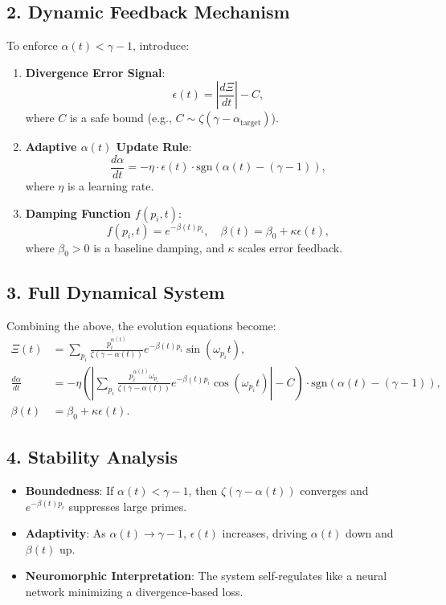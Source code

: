 \documentclass{article}
\theoremstyle{plain}
\theoremstyle{claimstyle}
\begin{document}
\subsection*{2. Dynamic Feedback Mechanism}

To enforce \( \alpha(t) < \gamma - 1 \), introduce:

\begin{enumerate}
    \item \textbf{Divergence Error Signal}:
    \[
    \epsilon(t) = \left| \frac{d\Xi}{dt} \right| - C,
    \]
    where \( C \) is a safe bound (e.g., \( C \sim \zeta(\gamma - \alpha_{\text{target}}) \)).

    \item \textbf{Adaptive \( \alpha(t) \) Update Rule}:
    \[
    \frac{d\alpha}{dt} = -\eta \cdot \epsilon(t) \cdot \text{sgn}(\alpha(t) - (\gamma - 1)),
    \]
    where \( \eta \) is a learning rate.

    \item \textbf{Damping Function \( f(p_i, t) \)}:
    \[
    f(p_i, t) = e^{-\beta(t) p_i}, \quad \beta(t) = \beta_0 + \kappa \epsilon(t),
    \]
    where \( \beta_0 > 0 \) is a baseline damping, and \( \kappa \) scales error feedback.
\end{enumerate}

\subsection*{3. Full Dynamical System}

Combining the above, the evolution equations become:
\[
\begin{aligned}
\Xi(t) &= \sum_{p_i} \frac{p_i^{\alpha(t)}}{\zeta(\gamma - \alpha(t))} e^{-\beta(t) p_i} \sin(\omega_{p_i} t), \\
\frac{d\alpha}{dt} &= -\eta \left( \left| \sum_{p_i} \frac{p_i^{\alpha(t)} \omega_{p_i}}{\zeta(\gamma - \alpha(t))} e^{-\beta(t) p_i} \cos(\omega_{p_i} t) \right| - C \right) \cdot \text{sgn}(\alpha(t) - (\gamma - 1)), \\
\beta(t) &= \beta_0 + \kappa \epsilon(t).
\end{aligned}
\]

\subsection*{4. Stability Analysis}

\begin{itemize}
    \item \textbf{Boundedness}: If \( \alpha(t) < \gamma - 1 \), then \( \zeta(\gamma - \alpha(t)) \) converges and \( e^{-\beta(t) p_i} \) suppresses large primes.
    \item \textbf{Adaptivity}: As \( \alpha(t) \to \gamma - 1 \), \( \epsilon(t) \) increases, driving \( \alpha(t) \) down and \( \beta(t) \) up.
    \item \textbf{Neuromorphic Interpretation}: The system self-regulates like a neural network minimizing a divergence-based loss.
\end{itemize}
\end{document}
